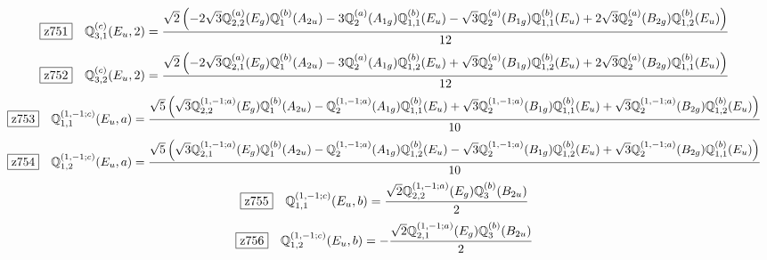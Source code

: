 \documentclass[fleqn,10pt,landscape]{jsarticle}
\begin{document}
\begin{dmath*}
\hspace*{3mm}\fbox{z751}\quad \mathbb{Q}_{3,1}^{(c)}(E_{u},2)=\frac{\sqrt{2} \left(- 2 \sqrt{3} \mathbb{Q}_{2,2}^{(a)}(E_{g}) \mathbb{Q}_{1}^{(b)}(A_{2u}) - 3 \mathbb{Q}_{2}^{(a)}(A_{1g}) \mathbb{Q}_{1,1}^{(b)}(E_{u}) - \sqrt{3} \mathbb{Q}_{2}^{(a)}(B_{1g}) \mathbb{Q}_{1,1}^{(b)}(E_{u}) + 2 \sqrt{3} \mathbb{Q}_{2}^{(a)}(B_{2g}) \mathbb{Q}_{1,2}^{(b)}(E_{u})\right)}{12}
\end{dmath*}
\begin{dmath*}
\hspace*{3mm}\fbox{z752}\quad \mathbb{Q}_{3,2}^{(c)}(E_{u},2)=\frac{\sqrt{2} \left(- 2 \sqrt{3} \mathbb{Q}_{2,1}^{(a)}(E_{g}) \mathbb{Q}_{1}^{(b)}(A_{2u}) - 3 \mathbb{Q}_{2}^{(a)}(A_{1g}) \mathbb{Q}_{1,2}^{(b)}(E_{u}) + \sqrt{3} \mathbb{Q}_{2}^{(a)}(B_{1g}) \mathbb{Q}_{1,2}^{(b)}(E_{u}) + 2 \sqrt{3} \mathbb{Q}_{2}^{(a)}(B_{2g}) \mathbb{Q}_{1,1}^{(b)}(E_{u})\right)}{12}
\end{dmath*}
\begin{dmath*}
\hspace*{3mm}\fbox{z753}\quad \mathbb{Q}_{1,1}^{(1,-1;c)}(E_{u},a)=\frac{\sqrt{5} \left(\sqrt{3} \mathbb{Q}_{2,2}^{(1,-1;a)}(E_{g}) \mathbb{Q}_{1}^{(b)}(A_{2u}) - \mathbb{Q}_{2}^{(1,-1;a)}(A_{1g}) \mathbb{Q}_{1,1}^{(b)}(E_{u}) + \sqrt{3} \mathbb{Q}_{2}^{(1,-1;a)}(B_{1g}) \mathbb{Q}_{1,1}^{(b)}(E_{u}) + \sqrt{3} \mathbb{Q}_{2}^{(1,-1;a)}(B_{2g}) \mathbb{Q}_{1,2}^{(b)}(E_{u})\right)}{10}
\end{dmath*}
\begin{dmath*}
\hspace*{3mm}\fbox{z754}\quad \mathbb{Q}_{1,2}^{(1,-1;c)}(E_{u},a)=\frac{\sqrt{5} \left(\sqrt{3} \mathbb{Q}_{2,1}^{(1,-1;a)}(E_{g}) \mathbb{Q}_{1}^{(b)}(A_{2u}) - \mathbb{Q}_{2}^{(1,-1;a)}(A_{1g}) \mathbb{Q}_{1,2}^{(b)}(E_{u}) - \sqrt{3} \mathbb{Q}_{2}^{(1,-1;a)}(B_{1g}) \mathbb{Q}_{1,2}^{(b)}(E_{u}) + \sqrt{3} \mathbb{Q}_{2}^{(1,-1;a)}(B_{2g}) \mathbb{Q}_{1,1}^{(b)}(E_{u})\right)}{10}
\end{dmath*}
\begin{dmath*}
\hspace*{3mm}\fbox{z755}\quad \mathbb{Q}_{1,1}^{(1,-1;c)}(E_{u},b)=\frac{\sqrt{2} \mathbb{Q}_{2,2}^{(1,-1;a)}(E_{g}) \mathbb{Q}_{3}^{(b)}(B_{2u})}{2}
\end{dmath*}
\begin{dmath*}
\hspace*{3mm}\fbox{z756}\quad \mathbb{Q}_{1,2}^{(1,-1;c)}(E_{u},b)=- \frac{\sqrt{2} \mathbb{Q}_{2,1}^{(1,-1;a)}(E_{g}) \mathbb{Q}_{3}^{(b)}(B_{2u})}{2}
\end{dmath*}
\end{document}
